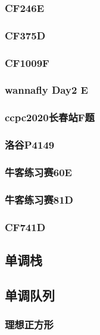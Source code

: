 \documentclass[10pt,a4paper]{article}
\begin{document}
	\subsubsection{CF246E}
	
	\subsubsection{CF375D}
	
	\subsubsection{CF1009F}
	
	\subsubsection{wannafly Day2 E}
	
	\subsubsection{ccpc2020长春站F题}
	
	\subsubsection{洛谷P4149}
	
	\subsubsection{牛客练习赛60E}
	
	\subsubsection{牛客练习赛81D}
	
	\subsubsection{CF741D}
	
	\subsection{单调栈}
	
	\subsection{单调队列}
	\subsubsection{理想正方形}
	
\end{document}
